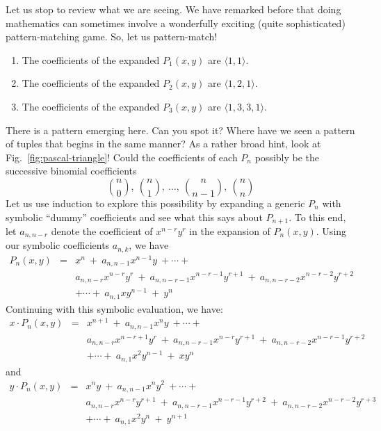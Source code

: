 Let us stop to review what we are seeing.  We have remarked before
that doing mathematics can sometimes involve a wonderfully exciting
(quite sophisticated) pattern-matching game.  So, let us pattern-match!
\begin{enumerate}
\item
The coefficients of the expanded $P_1(x,y)$ are $\langle 1,1 \rangle$.
\item
The coefficients of the expanded $P_2(x,y)$ are $\langle 1,2,1 \rangle$.
\item
The coefficients of the expanded $P_3(x,y)$ are $\langle 1,3,3,1 \rangle$.
\end{enumerate}
There is a pattern emerging here.  Can you spot it?  Where have we
seen a pattern of tuples that begins in the same manner?  As a rather
broad hint, look at Fig.~\ref{fig:pascal-triangle}!  Could the
coefficients of each $P_n$ possibly be the successive binomial
coefficients
\[ {n \choose 0}, \ {n \choose 1}, \ \ldots, \ {n \choose {n-1}}, \ {n
  \choose n}
\]
Let us use induction to explore this possibility by expanding a
generic $P_n$ with symbolic ``dummy'' coefficients and see what this
says about $P_{n+1}$.  To this end, let $a_{n,n-r}$ denote the
coefficient of $x^{n-r} y^r$ in the expansion of $P_n(x,y)$.  Using
our symbolic coefficients $a_{n,k}$, we have
\begin{eqnarray*}
P_n(x,y) & = &
 x^n \ + \ a_{n,n-1} x^{n-1} y \ + \cdots + \\
         &   &
a_{n,n-r} x^{n-r} y^r \ + \ a_{n,n-r-1} x^{n-r-1} y^{r+1}
\ + \ a_{n,n-r-2} x^{n-r-2} y^{r+2} \\
         &   &
+ \cdots + \ a_{n,1} x y^{n-1} \ + \ y^n
\end{eqnarray*}
Continuing with this symbolic evaluation, we have:
\begin{eqnarray}
\nonumber
x \cdot P_n(x,y) & = &
 x^{n+1} \ + \ a_{n,n-1} x^n y \ + \cdots + \\
\nonumber
         &   &
a_{n,n-r} x^{n-r+1} y^r \ + \ a_{n,n-r-1} x^{n-r} y^{r+1}
\ + \ a_{n,n-r-2} x^{n-r-1} y^{r+2} \\
\label{eq:xPk}
         &   &
+ \cdots + \ a_{n,1} x^2 y^{n-1} \ + \ x y^n
\end{eqnarray}
and
\begin{eqnarray}
\nonumber
y \cdot P_n(x,y) & = &
 x^n y \ + \ a_{n,n-1} x^n y^2 \ + \cdots + \\
\nonumber
         &   &
a_{n,n-r} x^{n-r} y^{r+1} \ + \ a_{n,n-r-1} x^{n-r-1} y^{r+2}
\ + \ a_{n,n-r-2} x^{n-r-2} y^{r+3} \\
\label{eq:yPk}
         &   &
+ \cdots  + \ a_{n,1} x^2 y^n \ + \ y^{n+1}
\end{eqnarray}
